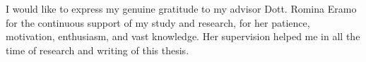 \renewcommand{\sfdefault}{phv}

I would like to express my genuine gratitude to my advisor Dott. Romina Eramo for the continuous support of my study and research, for her patience, motivation, enthusiasm, and vast knowledge. Her supervision helped me in all the time of research and writing of this thesis. 
